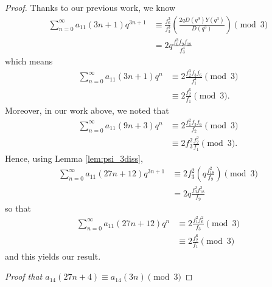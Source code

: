 \documentclass[10pt, reqno]{amsart}
\theoremstyle{theorem}
\theoremstyle{definition}
\theoremstyle{example}
\begin{document}
\begin{proof}
\noindent 
Thanks to our previous work, we know 
\begin{align*}
\sum_{n=0}^\infty a_{11}(3n+1)q^{3n+1} 
&\equiv 
\frac{f_6^3}{f_3^3}\left( \frac{2qD(q^9)Y(q^3)}{D(q^3)}  \right) \pmod{3} \\
&=
2q\frac{f_6^3f_9f_{18}}{f_3^4}
\end{align*}
which means 
\begin{align*}
\sum_{n=0}^\infty a_{11}(3n+1)q^{n} 
&\equiv 
2\frac{f_2^3f_3f_6}{f_1^4} \pmod{3} \\
&\equiv 
2\frac{f_2^6}{f_1} \pmod{3}.  
\end{align*}
Moreover, in our work above, we noted that 
\begin{align*}
\sum_{n=0}^\infty a_{11}(9n+3)q^{n} 
&\equiv 
2\frac{f_1^2f_3f_6}{f_2} \pmod{3} \\
&\equiv 
2f_3^2\frac{f_2^2}{f_1} \pmod{3}.
\end{align*}
Hence, using Lemma \ref{lem:psi_3diss},
\begin{align*}
\sum_{n=0}^\infty a_{11}(27n+12)q^{3n+1} 
&\equiv 
2f_3^2\left( q\frac{f_{18}^2}{f_9}\right) \pmod{3} \\
&= 
2q\frac{f_3^2f_{18}^2}{f_9} 
\end{align*}
so that 
\begin{align*}
\sum_{n=0}^\infty a_{11}(27n+12)q^{n} 
&\equiv 
2\frac{f_1^2f_{6}^2}{f_3}  \pmod{3} \\
&\equiv 
2\frac{f_2^6}{f_{1}} \pmod{3} 
\end{align*}
and this yields our result.  

\bigskip  

\noindent
{\it Proof that $a_{14}(27n+4) \equiv a_{14}(3n) \pmod{3}$}

\bigskip 


\end{proof}
\end{document}
